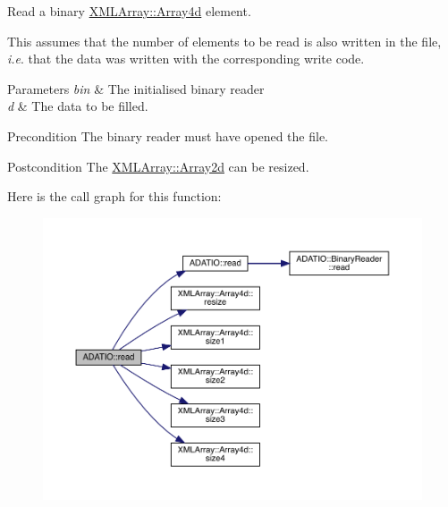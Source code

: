 Read a binary \mbox{\hyperlink{classXMLArray_1_1Array4d}{X\+M\+L\+Array\+::\+Array4d}} element. 

This assumes that the number of elements to be read is also written in the file, {\itshape i.\+e}. that the data was written with the corresponding write code. 
\begin{DoxyParams}{Parameters}
{\em bin} & The initialised binary reader \\
\hline
{\em d} & The data to be filled.\\
\hline
\end{DoxyParams}
\begin{DoxyPrecond}{Precondition}
The binary reader must have opened the file. 
\end{DoxyPrecond}
\begin{DoxyPostcond}{Postcondition}
The \mbox{\hyperlink{classXMLArray_1_1Array2d}{X\+M\+L\+Array\+::\+Array2d}} can be resized. 
\end{DoxyPostcond}
Here is the call graph for this function\+:\nopagebreak
\begin{figure}[H]
\begin{center}
\leavevmode
\includegraphics[width=350pt]{d0/dba/namespaceADATIO_a0e3333d0774c69f2c6a38b013e23d02b_cgraph}
\end{center}
\end{figure}
\mbox{\label{namespaceADATIO_a0b5c3397d644a4f522e7b097825986cb}} 
